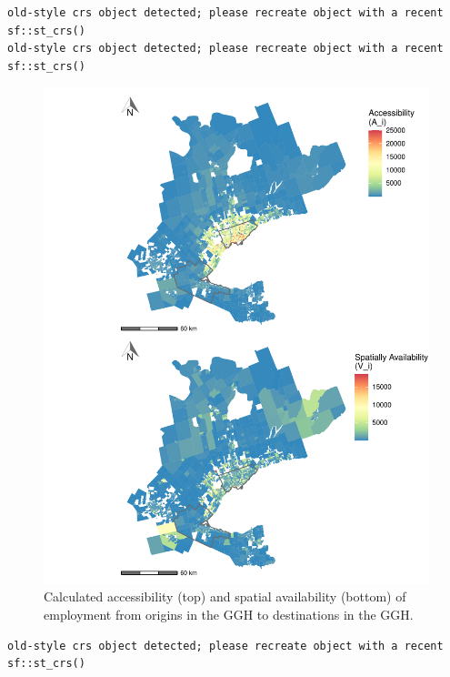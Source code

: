 \documentclass[]{elsarticle} %
\begin{document}
\begin{verbatim}
old-style crs object detected; please recreate object with a recent sf::st_crs()
old-style crs object detected; please recreate object with a recent sf::st_crs()
\end{verbatim}

\begin{figure}
\includegraphics[width=1\linewidth]{Spatial-Availability_files/figure-latex/plot-access-SA-GGH-1} \caption{\label{fig:plot-access-SA-GGH-TTS}Calculated accessibility (top) and spatial availability (bottom) of employment from origins in the GGH to destinations in the GGH.}\label{fig:plot-access-SA-GGH}
\end{figure}

\begin{verbatim}
old-style crs object detected; please recreate object with a recent sf::st_crs()
\end{verbatim}
\end{document}
